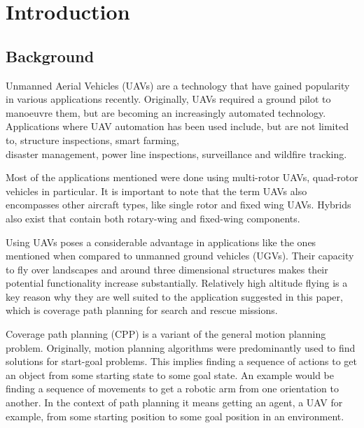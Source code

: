 \chapter{Introduction}
\label{chp:intro}


\section{Background}

Unmanned Aerial Vehicles (UAVs) are a technology that have gained popularity in various applications recently\cite{CPP-Survey-2019}. Originally, UAVs required a ground pilot to manoeuvre them, but are becoming an increasingly automated technology. Applications where UAV automation has been used include, but are not limited to, structure inspections\cite{Guerrero2013}, smart farming\cite{Lottes2017}, \\disaster management\cite{Maza2011}, power line inspections\cite{Chang2017}, surveillance\cite{Basilico2015} and wildfire tracking\cite{Pham2017}.

Most of the applications mentioned were done using multi-rotor UAVs, quad-rotor vehicles in particular. It is important to note that the term UAVs also encompasses other aircraft types, like single rotor and fixed wing UAVs. Hybrids also exist that contain both rotary-wing and fixed-wing components\cite{CPP-Survey-2019}.

Using UAVs poses a considerable advantage in applications like the ones mentioned when compared to unmanned ground vehicles (UGVs). Their capacity to fly over landscapes and around three dimensional structures makes their potential functionality increase substantially. Relatively high altitude flying is a key reason why they are well suited to the application suggested in this paper, which is coverage path planning for search and rescue missions.

Coverage path planning (CPP) is a variant of the general motion planning problem. Originally, motion planning algorithms were predominantly used to find solutions for start-goal problems\cite{Choset2001}. This implies finding a sequence of actions to get an object from some starting state to some goal state. An example would be finding a sequence of movements to get a robotic arm from one orientation to another. In the context of path planning it means getting an agent, a UAV for example, from some starting position to some goal position in an environment\cite{Lynch2017}.

